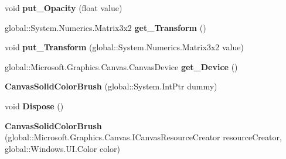 \begin{DoxyCompactItemize}
void {\bfseries put\+\_\+\+Opacity} (float value)
\item 
\mbox{\label{class_microsoft_1_1_graphics_1_1_canvas_1_1_brushes_1_1_canvas_solid_color_brush_a2b2f902cd1e5c64a15046373aa41e3a2}} 
global\+::\+System.\+Numerics.\+Matrix3x2 {\bfseries get\+\_\+\+Transform} ()
\item 
\mbox{\label{class_microsoft_1_1_graphics_1_1_canvas_1_1_brushes_1_1_canvas_solid_color_brush_a7b140214aea009b6e971d810598a4410}} 
void {\bfseries put\+\_\+\+Transform} (global\+::\+System.\+Numerics.\+Matrix3x2 value)
\item 
\mbox{\label{class_microsoft_1_1_graphics_1_1_canvas_1_1_brushes_1_1_canvas_solid_color_brush_a9b921bed44082b56dc498621035b25f9}} 
global\+::\+Microsoft.\+Graphics.\+Canvas.\+Canvas\+Device {\bfseries get\+\_\+\+Device} ()
\item 
\mbox{\label{class_microsoft_1_1_graphics_1_1_canvas_1_1_brushes_1_1_canvas_solid_color_brush_a7e4a9e90a6cd5e8ff75d6b8b37409b35}} 
{\bfseries Canvas\+Solid\+Color\+Brush} (global\+::\+System.\+Int\+Ptr dummy)
\item 
\mbox{\label{class_microsoft_1_1_graphics_1_1_canvas_1_1_brushes_1_1_canvas_solid_color_brush_a46f1e2e21dc08f8da7c1a89fd59311fc}} 
void {\bfseries Dispose} ()
\item 
\mbox{\label{class_microsoft_1_1_graphics_1_1_canvas_1_1_brushes_1_1_canvas_solid_color_brush_a6a9cfff8962b0007c46d54d3d60cd93f}} 
{\bfseries Canvas\+Solid\+Color\+Brush} (global\+::\+Microsoft.\+Graphics.\+Canvas.\+I\+Canvas\+Resource\+Creator resource\+Creator, global\+::\+Windows.\+U\+I.\+Color color)
\item 
\mbox{\label{class_microsoft_1_1_graphics_1_1_canvas_1_1_brushes_1_1_canvas_solid_color_brush_ac3b79256cdb5b26bcce81d701c5d722a}} 

\end{DoxyCompactItemize}
